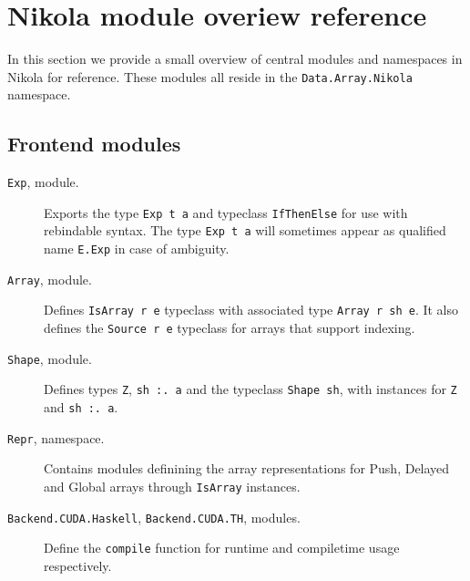 \section{Nikola module overiew reference} \label{section:nikola-reference}

In this section we provide a small overview of central modules and namespaces
in Nikola for reference. These modules all reside in the
\texttt{Data.Array.Nikola} namespace.

\subsection{Frontend modules}
\begin{description}

  \item[\texttt{Exp}, module.] Exports the type \texttt{Exp t a} and typeclass
    \texttt{IfThenElse} for use with rebindable syntax. The type \texttt{Exp t
    a} will sometimes appear as qualified name \texttt{E.Exp} in case of
    ambiguity.

  \item[\texttt{Array}, module.] Defines \texttt{IsArray r e} typeclass with
    associated type \texttt{Array r sh e}. It also defines the
    \texttt{Source r e} typeclass for arrays that support indexing.

  \item[\texttt{Shape}, module.] Defines types \texttt{Z}, \texttt{sh :. a}
    and the typeclass \texttt{Shape sh}, with instances for \texttt{Z} and
    \texttt{sh :. a}.

  \item[\texttt{Repr}, namespace.] Contains modules definining the array
    representations for Push, Delayed and Global arrays through
    \texttt{IsArray} instances.

  \item[\texttt{Backend.CUDA.Haskell}, \texttt{Backend.CUDA.TH}, modules.]
    Define the \texttt{compile} function for runtime and compiletime usage
    respectively.

\end{description}

